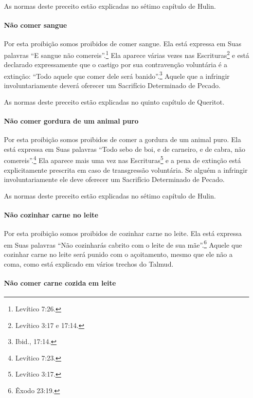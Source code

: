 \begin{multicols}{2}
As normas deste preceito estão explicadas no sétimo capítulo de Hulin\starr.

\paragraph{Não comer sangue}

Por esta proibição somos proibidos de comer sangue. Ela está expressa
em Suas palavras ``E sangue não comereis''.\footnote{Levítico 7:26.} Ela aparece
várias vezes nas Escrituras\footnote{Levítico 3:17 e 17:14.} e está declarado
expressamente que o castigo por sua contravenção voluntária é a
extinção: ``Todo aquele que comer dele será banido''.\footnote{Ibid., 17:14.}
Aquele que a infringir involuntariamente deverá oferecer um Sacrifício
Determinado de Pecado.

As normas deste preceito estão explicadas no quinto capítulo de Queritot\starr.

\paragraph{Não comer gordura de um animal puro}

Por esta proibição somos proibidos de comer a gordura de um animal
puro. Ela está expressa em Suas palavras ``Todo sebo de boi, e de
carneiro, e de cabra, não comereis''.\footnote{Levítico 7:23.} Ela aparece mais
uma vez nas Escrituras\footnote{Levítico 3:17.} e a pena de extinção está
explicitamente prescrita em caso de transgressão voluntária. Se alguém a
infringir involuntariamente ele deve oferecer um Sacrifício Determinado
de Pecado.

As normas deste preceito estão explicadas no sétimo capítulo de Hulin\starr.

\paragraph{Não cozinhar carne no leite}

Por esta proibição somos proibidos de cozinhar carne no leite. Ela está
expressa em Suas palavras ``Não cozinharás cabrito com o leite de sua
mãe''.\footnote{Êxodo 23:19.} Aquele que cozinhar carne no leite será punido com o
açoitamento, mesmo que ele não a coma, como está explicado em vários
trechos do Talmud\starr.

\paragraph{Não comer carne cozida em leite}


\end{multicols}
